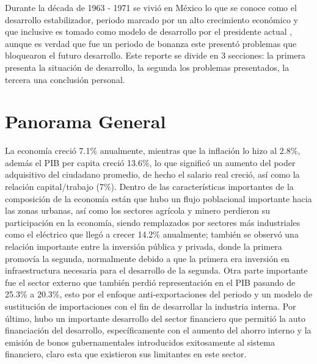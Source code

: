 
Durante la década de 1963 - 1971 se vivió en México lo que se conoce como el desarrollo estabilizador, periodo marcado por un alto crecimiento económico y que inclusive es tomado como modelo de desarrollo por el presidente actual \cite{AmloDesarrolloEstab}, aunque es verdad que fue un periodo de bonanza este presentó problemas que bloquearon el futuro desarrollo. Este reporte se divide en 3 secciones: la primera presenta la situación de desarrollo, la segunda los problemas presentados, la tercera una conclusión personal.

\section{Panorama General}
La economía creció 7.1\% anualmente, mientras que la inflación lo hizo al 2.8\%, además el PIB per capita creció 13.6\%, lo que significó un aumento del poder adquisitivo del ciudadano promedio, de hecho el salario real creció, así como la relación capital/trabajo (7\%). Dentro de las características importantes de la composición de la economía están que hubo un flujo poblacional importante hacia las zonas urbanas, así como los sectores agrícola y minero perdieron su participación en la economía, siendo remplazados por sectores más industriales como el eléctrico que llegó a crecer 14.2\% anualmente; también se observó una relación importante entre la inversión pública y privada, donde la primera promovía la segunda, normalmente debido a que la primera era inversión en infraestructura necesaria para el desarrollo de la segunda. Otra parte importante fue el sector externo que también perdió representación en el PIB pasando de 25.3\% a 20.3\%, esto por el enfoque anti-exportaciones del periodo y un modelo de sustitución de importaciones con el fin de desarrollar la industria interna. Por último, hubo un importante desarrollo del sector financiero que permitió la auto financiación del desarrollo, específicamente con el aumento del ahorro interno y la emisión de bonos gubernamentales introducidos exitosamente al sistema financiero, claro esta que existieron sus limitantes en este sector.

